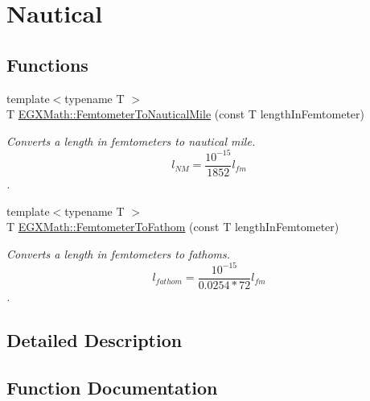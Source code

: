 \hypertarget{group___e_g_x_math-_conversions-_length_conversions-_s_i-_femtometer-_nautical}{}\section{Nautical}
\label{group___e_g_x_math-_conversions-_length_conversions-_s_i-_femtometer-_nautical}
\subsection*{Functions}
\begin{DoxyCompactItemize}
\item 
{\footnotesize template$<$typename T $>$ }\\T \mbox{\hyperlink{group___e_g_x_math-_conversions-_length_conversions-_s_i-_femtometer-_nautical_gae44357e3e44868120d603cff76cefd77}{E\+G\+X\+Math\+::\+Femtometer\+To\+Nautical\+Mile}} (const T length\+In\+Femtometer)
\begin{DoxyCompactList}\small\item\em Converts a length in femtometers to nautical mile. \[ l_{NM}= \frac{10^{-15}}{1852} l_{fm} \]. \end{DoxyCompactList}\item 
{\footnotesize template$<$typename T $>$ }\\T \mbox{\hyperlink{group___e_g_x_math-_conversions-_length_conversions-_s_i-_femtometer-_nautical_ga2a7aadfe2325db467434f8bc9b2d9ed9}{E\+G\+X\+Math\+::\+Femtometer\+To\+Fathom}} (const T length\+In\+Femtometer)
\begin{DoxyCompactList}\small\item\em Converts a length in femtometers to fathoms. \[ l_{fathom}= \frac{10^{-15}}{0.0254 * 72} l_{fm} \]. \end{DoxyCompactList}\end{DoxyCompactItemize}


\subsection{Detailed Description}


\subsection{Function Documentation}
\mbox{\label{group___e_g_x_math-_conversions-_length_conversions-_s_i-_femtometer-_nautical_ga2a7aadfe2325db467434f8bc9b2d9ed9}} 
